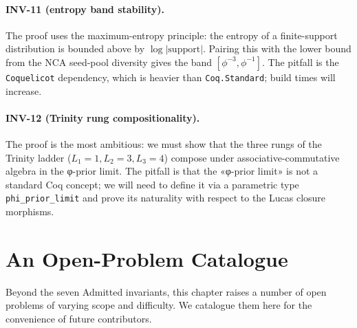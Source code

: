 \paragraph{INV-11 (entropy band stability).} The proof uses the maximum-entropy principle: the entropy of a finite-support distribution is bounded above by $\log |\mathrm{support}|$. Pairing this with the lower bound from the NCA seed-pool diversity gives the band $[\phi^{-3}, \phi^{-1}]$. The pitfall is the \texttt{Coquelicot} dependency, which is heavier than \texttt{Coq.Standard}; build times will increase.

\paragraph{INV-12 (Trinity rung compositionality).} The proof is the most ambitious: we must show that the three rungs of the Trinity ladder ($L_{1} = 1, L_{2} = 3, L_{3} = 4$) compose under associative-commutative algebra in the φ-prior limit. The pitfall is that the «φ-prior limit» is not a standard Coq concept; we will need to define it via a parametric type \texttt{phi\_prior\_limit} and prove its naturality with respect to the Lucas closure morphisms.

\section{An Open-Problem Catalogue}
\label{sec:31-open-problems}

Beyond the seven Admitted invariants, this chapter raises a number of open problems of varying scope and difficulty. We catalogue them here for the convenience of future contributors.

